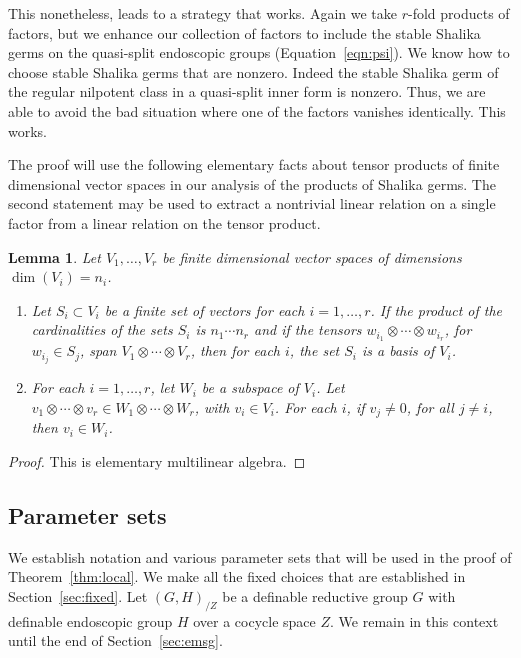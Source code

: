 \documentclass[12pt]{amsart}
\theoremstyle{plain}
\newtheorem{lem}[thm]{Lemma}
\theoremstyle{definition}
\begin{document}
This nonetheless, leads to a strategy that works.  Again we take
$r$-fold products of factors, but we enhance our collection of factors
to include the stable Shalika germs on the quasi-split endoscopic
groups (Equation~\ref{eqn:psi}).  We know how to choose stable Shalika
germs that are nonzero.  Indeed the stable Shalika germ of the regular
nilpotent class in a quasi-split inner form is nonzero.  Thus, we are
able to avoid the bad situation where one of the factors vanishes
identically.  This works.

The proof will use the following elementary facts about tensor
products of finite dimensional vector spaces in our analysis of the
products of Shalika germs.  The second statement may be used to
extract a nontrivial linear relation on a single factor from a linear
relation on the tensor product.

\begin{lem}\label{thm:tensor}
Let $V_1,\ldots,V_r$ be finite dimensional vector spaces of
dimensions $\dim(V_i) = n_i$.  
\begin{enumerate}
\item 
Let $S_i\subset V_i$ be a finite set of vectors for each
  $i = 1,\ldots,r$. 
If the product of the cardinalities of the
  sets $S_i$ is $n_1\cdots n_r$ and if the tensors $w_{i_1}\otimes
 \cdots\otimes w_{i_r}$, for $w_{i_j}\in S_j$, span 
$V_1\otimes\cdots\otimes V_r$, then
  for each $i$, the set $S_i$ is a basis of $V_i$.
\item For each $i=1,\ldots,r$, let $W_i$ be a subspace of
$V_i$.  Let $v_{1}\otimes \cdots \otimes v_{r} \in
  W_1\otimes\cdots\otimes W_r$, with $v_{i}\in V_i$.  For
  each $i$, if $v_{j}\ne0$, for all $j\ne i$, then
  $v_{i}\in W_i$.
\end{enumerate}
\end{lem}

\begin{proof} This is elementary multilinear algebra.
\end{proof}

\subsection{Parameter sets}

We establish notation and various parameter sets that will be used in
the proof of Theorem~\ref{thm:local}.  We make all the fixed choices
that are established in Section~\ref{sec:fixed}.  Let $(G,H)_{/Z}$ be
a definable reductive group $G$ with definable endoscopic group $H$
over a cocycle space $Z$.  We remain in this context until the end of
Section~\ref{sec:emsg}.
\end{document}
